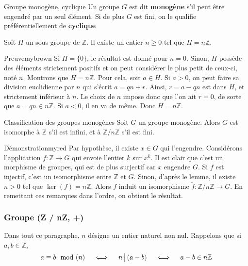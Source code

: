     \begin{defi}{Groupe monogène, cyclique}{}
        Un groupe $G$ est dit \textbf{monogène} s’il peut être engendré par un seul élément. Si de plus $G$ est fini, on le qualifie préférentiellement de \textbf{cyclique}
    \end{defi}

    \begin{lem}{}{}
        Soit $H$ un sous-groupe de $\mathbb{Z}$. Il existe un entier $n \geq 0$ tel que $H = n \mathbb{Z}$.
    \end{lem}

    \begin{demo}{Preuve}{mybrown}
        Si $H = \{ 0 \}$, le résultat est donné pour $n = 0$. Sinon, $H$ possède des éléments strictement positifs et on peut considérer le plus petit de ceux-ci, noté $n$. Montrons que $H = n \mathbb{Z}$. Pour cela, soit $a \in H$. Si $a > 0$, on peut faire sa division euclidienne par $n$ qui s’écrit $a = qn + r$. Ainsi, $ r = a - qn$ est dans $H$, et strictement inférieur à $n$. Le choix de $n$ impose donc que l’on ait $r = 0$, de sorte que $a = qn \in n \mathbb{Z}$. Si $a < 0$, il en va de même. Donc $H = n \mathbb{Z}$.
    \end{demo}

    \begin{theo}{Classification des groupes monogènes}{}
        Soit $G$ un groupe monogène. Alors $G$ est isomorphe à $\mathbb{Z}$ s’il est infini, et à $\mathbb{Z} / n \mathbb{Z}$ s’il est fini.
    \end{theo}

    \begin{demo}{Démonstration}{myred}
        Par hypothèse, il existe $x \in G$ qui l’engendre. Considérons l’application $f : \mathbb{Z} \to G$ qui envoie l’entier $k$ sur $x^{k}$. Il est clair que c’est un morphisme de groupes, qui est de plus surjectif car $x$ engendre $G$. Si $f$ est injectif, c’est un isomorphisme entre $\mathbb{Z}$ et $G$. Sinon, d’après le lemme, il existe $n > 0$ tel que $\ker(f) = n \mathbb{Z}$. Alors $f$ induit un isomorphisme $\tilde{f} :\mathbb{Z} / n \mathbb{Z} \to G$. En remettant ces remarques dans l’ordre, on obtient le résultat.
    \end{demo}

    \subsubsection{Groupe (Z / nZ, +)}

    Dans tout ce paragraphe, $n$ désigne un entier naturel non nul. Rappelons que si $a,b \in \mathbb{Z}$, 
    \[ a \equiv b \mod(n) \quad \iff \quad n \, \big| \, (a-b) \quad \iff \quad a-b \in n \mathbb{Z} \]

